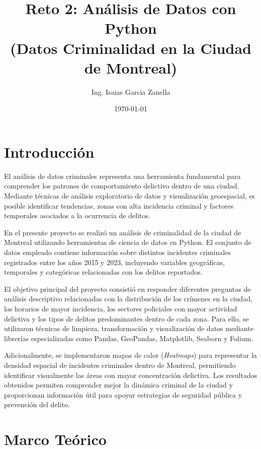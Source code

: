 \documentclass[12pt]{article}
\title{Reto 2: Análisis de Datos con Python \\(Datos Criminalidad en la Ciudad de Montreal)}
\author{Ing. Isaias Garcia Zanella}
\date{\today}
\begin{document}
\maketitle

\section{Introducción}

El análisis de datos criminales representa una herramienta fundamental para comprender los patrones de comportamiento delictivo dentro de una ciudad. Mediante técnicas de análisis exploratorio de datos y visualización geoespacial, es posible identificar tendencias, zonas con alta incidencia criminal y factores temporales asociados a la ocurrencia de delitos.

En el presente proyecto se realizó un análisis de criminalidad de la ciudad de Montreal utilizando herramientas de ciencia de datos en Python. El conjunto de datos empleado contiene información sobre distintos incidentes criminales registrados entre los años 2015 y 2023, incluyendo variables geográficas, temporales y categóricas relacionadas con los delitos reportados.

El objetivo principal del proyecto consistió en responder diferentes preguntas de análisis descriptivo relacionadas con la distribución de los crímenes en la ciudad, los horarios de mayor incidencia, los sectores policiales con mayor actividad delictiva y los tipos de delitos predominantes dentro de cada zona. Para ello, se utilizaron técnicas de limpieza, transformación y visualización de datos mediante librerías especializadas como Pandas, GeoPandas, Matplotlib, Seaborn y Folium.

Adicionalmente, se implementaron mapas de calor (\textit{Heatmaps}) para representar la densidad espacial de incidentes criminales dentro de Montreal, permitiendo identificar visualmente las áreas con mayor concentración delictiva. Los resultados obtenidos permiten comprender mejor la dinámica criminal de la ciudad y proporcionan información útil para apoyar estrategias de seguridad pública y prevención del delito.

\section{Marco Teórico}
\end{document}
